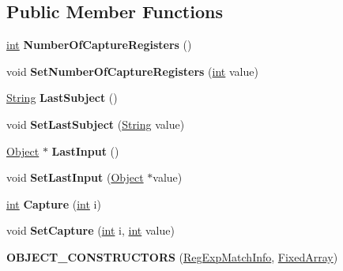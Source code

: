 \subsection*{Public Member Functions}
\begin{DoxyCompactItemize}
\item 
\mbox{\label{classv8_1_1internal_1_1RegExpMatchInfo_a77ef05d53ffd1dcc06ced1bca46f828c}} 
\mbox{\hyperlink{classint}{int}} {\bfseries Number\+Of\+Capture\+Registers} ()
\item 
\mbox{\label{classv8_1_1internal_1_1RegExpMatchInfo_ae8accb72ee0d84ee14943b3e6a4b82f3}} 
void {\bfseries Set\+Number\+Of\+Capture\+Registers} (\mbox{\hyperlink{classint}{int}} value)
\item 
\mbox{\label{classv8_1_1internal_1_1RegExpMatchInfo_a98c47883be129196d562a96d527a0127}} 
\mbox{\hyperlink{classv8_1_1internal_1_1String}{String}} {\bfseries Last\+Subject} ()
\item 
\mbox{\label{classv8_1_1internal_1_1RegExpMatchInfo_ab9a9ffdacec2221a57792c6f793ebbaa}} 
void {\bfseries Set\+Last\+Subject} (\mbox{\hyperlink{classv8_1_1internal_1_1String}{String}} value)
\item 
\mbox{\label{classv8_1_1internal_1_1RegExpMatchInfo_a3cce06b7bd21f6d987ae25ca8f783f50}} 
\mbox{\hyperlink{classv8_1_1internal_1_1Object}{Object}} $\ast$ {\bfseries Last\+Input} ()
\item 
\mbox{\label{classv8_1_1internal_1_1RegExpMatchInfo_a6c5ecdcfcd76c33a628c41b29d4d3685}} 
void {\bfseries Set\+Last\+Input} (\mbox{\hyperlink{classv8_1_1internal_1_1Object}{Object}} $\ast$value)
\item 
\mbox{\label{classv8_1_1internal_1_1RegExpMatchInfo_ac36f03dc42473f1768efe9bff0c70175}} 
\mbox{\hyperlink{classint}{int}} {\bfseries Capture} (\mbox{\hyperlink{classint}{int}} i)
\item 
\mbox{\label{classv8_1_1internal_1_1RegExpMatchInfo_ae4bb0b982aa3d82cff0045387447acd4}} 
void {\bfseries Set\+Capture} (\mbox{\hyperlink{classint}{int}} i, \mbox{\hyperlink{classint}{int}} value)
\item 
\mbox{\label{classv8_1_1internal_1_1RegExpMatchInfo_a1303e3f4d98286deaa3938bc1321dacb}} 
{\bfseries O\+B\+J\+E\+C\+T\+\_\+\+C\+O\+N\+S\+T\+R\+U\+C\+T\+O\+RS} (\mbox{\hyperlink{classv8_1_1internal_1_1RegExpMatchInfo}{Reg\+Exp\+Match\+Info}}, \mbox{\hyperlink{classv8_1_1internal_1_1FixedArray}{Fixed\+Array}})
\end{DoxyCompactItemize}
